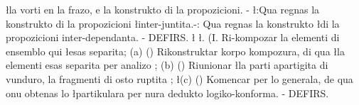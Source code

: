 {\l{la vorti en la frazo, e la konstrukto di la propozicioni. -}
\l{:Qua regnas la konstrukto di la propozicioni}
\l{inter-juntita.-: Qua regnas la konstrukto}
\l{di la propozicioni inter-dependanta. - DEFIRS.}
\l{}
\l{. (I. Ri-kompozar la elementi di ensemblo qui}
\l{esas separita; (a) () Rikonstruktar korpo kompozura, di qua}
\l{la elementi esas separita per analizo ; (b) () Riunionar}
\l{la parti apartigita di vunduro, la fragmenti di osto ruptita ;}
\l{(c) () Komencar per lo generala, de qua onu obtenas lo}
\l{partikulara per nura dedukto logiko-konforma. - DEFIRS.}
}

